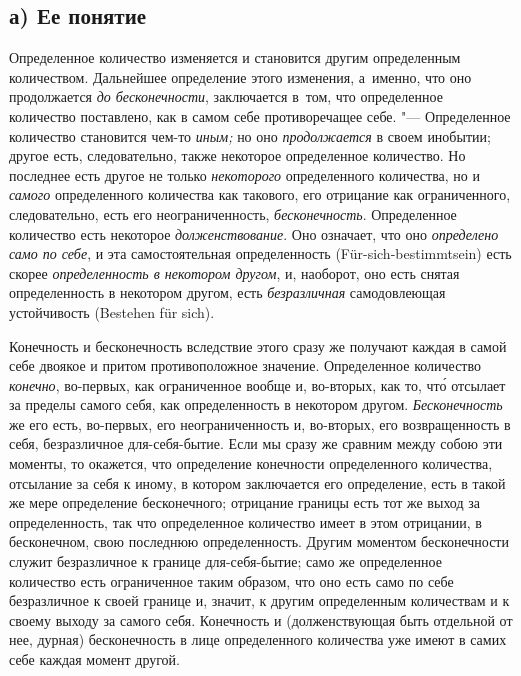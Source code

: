 
\subsection[а) Ее понятие]{а) Ее понятие}

Определенное количество изменяется и становится другим определенным
количеством. Дальнейшее определение этого изменения, а~именно, что оно
продолжается {\em до бесконечности}, заключается в~том, что определенное
количество поставлено, как в самом себе противоречащее себе. "--- Определенное
количество становится чем-то {\em иным;} но оно {\em продолжается} в своем
инобытии; другое есть, следовательно, также некоторое определенное количество.
Но последнее есть другое не только {\em некоторого} определенного количества,
но и {\em самого} определенного количества как такового, его отрицание как
ограниченного, следовательно, есть его неограниченность, {\em бесконечность}.
Определенное количество есть некоторое {\em долженствование}. Оно означает, что
оно {\em определено само по себе}, и эта самостоятельная определенность
(Für-sich-bestimmt\-sein) есть скорее {\em определенность в некотором другом}, и,
наоборот, оно есть снятая определенность в некотором другом, есть
{\em безразличная} самодовлеющая устойчивость (Bestehen für sich).

Конечность и бесконечность вследствие этого сразу же получают каждая в самой
себе двоякое и притом противоположное значение. Определенное количество
{\em конечно}, во-первых, как ограниченное вообще и, во-вторых, как то, чт\'{о}
отсылает за пределы самого себя, как определенность в некотором другом.
{\em Бесконечность} же его есть, во-первых, его неограниченность и, во-вторых,
его возвращенность в себя, безразличное для-себя-бытие. Если мы сразу же
сравним между собою эти моменты, то окажется, что определение конечности
определенного количества, отсылание за себя к иному, в котором заключается его
определение, есть в такой же мере определение бесконечного; отрицание границы
есть тот же выход за определенность, так что определенное количество имеет
в этом отрицании, в бесконечном, свою последнюю определенность. Другим моментом
бесконечности служит безразличное к границе для-себя-бытие; само же
определенное количество есть ограниченное таким образом, что оно есть само по
себе безразличное к своей границе и, значит, к другим определенным количествам
и к своему выходу за самого себя. Конечность и (долженствующая быть отдельной
от нее, дурная) бесконечность в лице определенного количества уже имеют в самих
себе каждая момент другой.

